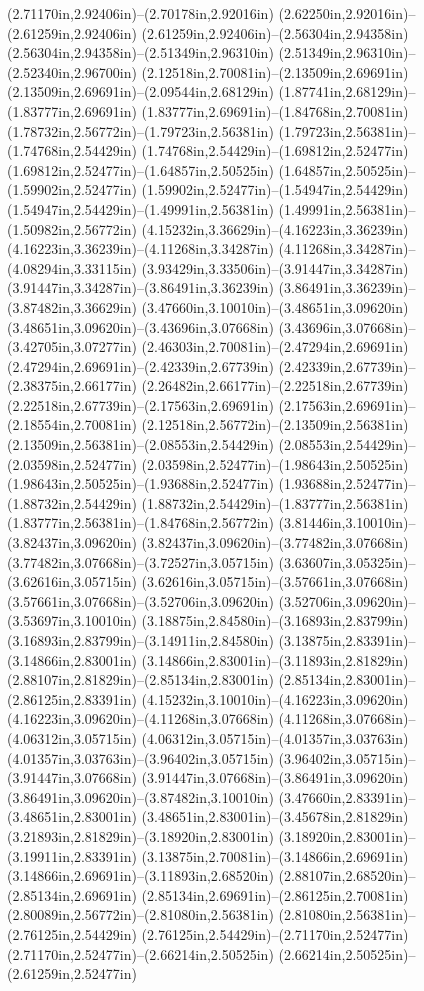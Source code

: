(2.71170in,2.92406in)--(2.70178in,2.92016in) (2.62250in,2.92016in)--(2.61259in,2.92406in) (2.61259in,2.92406in)--(2.56304in,2.94358in) (2.56304in,2.94358in)--(2.51349in,2.96310in) (2.51349in,2.96310in)--(2.52340in,2.96700in) (2.12518in,2.70081in)--(2.13509in,2.69691in) (2.13509in,2.69691in)--(2.09544in,2.68129in) (1.87741in,2.68129in)--(1.83777in,2.69691in) (1.83777in,2.69691in)--(1.84768in,2.70081in) (1.78732in,2.56772in)--(1.79723in,2.56381in) (1.79723in,2.56381in)--(1.74768in,2.54429in) (1.74768in,2.54429in)--(1.69812in,2.52477in) (1.69812in,2.52477in)--(1.64857in,2.50525in) (1.64857in,2.50525in)--(1.59902in,2.52477in) (1.59902in,2.52477in)--(1.54947in,2.54429in) (1.54947in,2.54429in)--(1.49991in,2.56381in) (1.49991in,2.56381in)--(1.50982in,2.56772in) (4.15232in,3.36629in)--(4.16223in,3.36239in) (4.16223in,3.36239in)--(4.11268in,3.34287in) (4.11268in,3.34287in)--(4.08294in,3.33115in) (3.93429in,3.33506in)--(3.91447in,3.34287in) (3.91447in,3.34287in)--(3.86491in,3.36239in) (3.86491in,3.36239in)--(3.87482in,3.36629in) (3.47660in,3.10010in)--(3.48651in,3.09620in) (3.48651in,3.09620in)--(3.43696in,3.07668in) (3.43696in,3.07668in)--(3.42705in,3.07277in) (2.46303in,2.70081in)--(2.47294in,2.69691in) (2.47294in,2.69691in)--(2.42339in,2.67739in) (2.42339in,2.67739in)--(2.38375in,2.66177in) (2.26482in,2.66177in)--(2.22518in,2.67739in) (2.22518in,2.67739in)--(2.17563in,2.69691in) (2.17563in,2.69691in)--(2.18554in,2.70081in) (2.12518in,2.56772in)--(2.13509in,2.56381in) (2.13509in,2.56381in)--(2.08553in,2.54429in) (2.08553in,2.54429in)--(2.03598in,2.52477in) (2.03598in,2.52477in)--(1.98643in,2.50525in) (1.98643in,2.50525in)--(1.93688in,2.52477in) (1.93688in,2.52477in)--(1.88732in,2.54429in) (1.88732in,2.54429in)--(1.83777in,2.56381in) (1.83777in,2.56381in)--(1.84768in,2.56772in) (3.81446in,3.10010in)--(3.82437in,3.09620in) (3.82437in,3.09620in)--(3.77482in,3.07668in) (3.77482in,3.07668in)--(3.72527in,3.05715in) (3.63607in,3.05325in)--(3.62616in,3.05715in) (3.62616in,3.05715in)--(3.57661in,3.07668in) (3.57661in,3.07668in)--(3.52706in,3.09620in) (3.52706in,3.09620in)--(3.53697in,3.10010in) (3.18875in,2.84580in)--(3.16893in,2.83799in) (3.16893in,2.83799in)--(3.14911in,2.84580in) (3.13875in,2.83391in)--(3.14866in,2.83001in) (3.14866in,2.83001in)--(3.11893in,2.81829in) (2.88107in,2.81829in)--(2.85134in,2.83001in) (2.85134in,2.83001in)--(2.86125in,2.83391in) (4.15232in,3.10010in)--(4.16223in,3.09620in) (4.16223in,3.09620in)--(4.11268in,3.07668in) (4.11268in,3.07668in)--(4.06312in,3.05715in) (4.06312in,3.05715in)--(4.01357in,3.03763in) (4.01357in,3.03763in)--(3.96402in,3.05715in) (3.96402in,3.05715in)--(3.91447in,3.07668in) (3.91447in,3.07668in)--(3.86491in,3.09620in) (3.86491in,3.09620in)--(3.87482in,3.10010in) (3.47660in,2.83391in)--(3.48651in,2.83001in) (3.48651in,2.83001in)--(3.45678in,2.81829in) (3.21893in,2.81829in)--(3.18920in,2.83001in) (3.18920in,2.83001in)--(3.19911in,2.83391in) (3.13875in,2.70081in)--(3.14866in,2.69691in) (3.14866in,2.69691in)--(3.11893in,2.68520in) (2.88107in,2.68520in)--(2.85134in,2.69691in) (2.85134in,2.69691in)--(2.86125in,2.70081in) (2.80089in,2.56772in)--(2.81080in,2.56381in) (2.81080in,2.56381in)--(2.76125in,2.54429in) (2.76125in,2.54429in)--(2.71170in,2.52477in) (2.71170in,2.52477in)--(2.66214in,2.50525in) (2.66214in,2.50525in)--(2.61259in,2.52477in) 